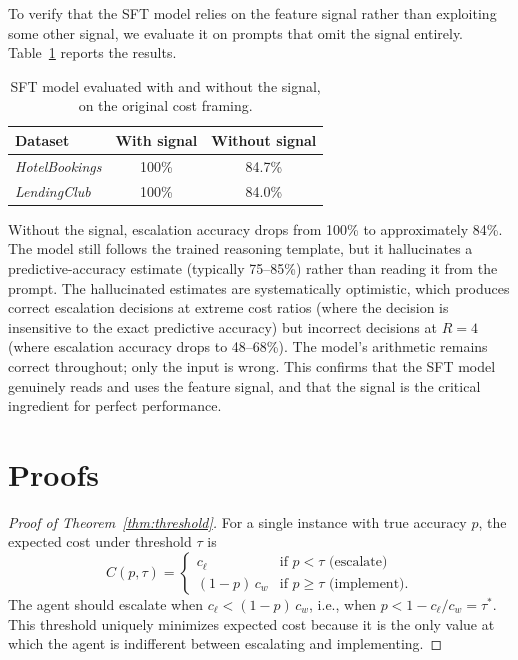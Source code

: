 \documentclass{article}
\begin{document}
To verify that the SFT model relies on the feature signal rather than exploiting some other signal, we evaluate it on prompts that omit the signal entirely. Table~\ref{tab:sft_nosignal} reports the results.

\begin{table}[h]
    \centering
    \caption{SFT model evaluated with and without the signal, on the original cost framing.}
    \label{tab:sft_nosignal}
    \begin{tabular}{lcc}
        \toprule
        Dataset & With signal & Without signal \\
        \midrule
        \emph{HotelBookings} & 100\% & 84.7\% \\
        \emph{LendingClub} & 100\% & 84.0\% \\
        \bottomrule
    \end{tabular}
\end{table}

Without the signal, escalation accuracy drops from 100\% to approximately 84\%. The model still follows the trained reasoning template, but it hallucinates a predictive-accuracy estimate (typically 75--85\%) rather than reading it from the prompt. The hallucinated estimates are systematically optimistic, which produces correct escalation decisions at extreme cost ratios (where the decision is insensitive to the exact predictive accuracy) but incorrect decisions at $R = 4$ (where escalation accuracy drops to 48--68\%). The model's arithmetic remains correct throughout; only the input is wrong. This confirms that the SFT model genuinely reads and uses the feature signal, and that the signal is the critical ingredient for perfect performance.

\section{Proofs}
\label{app:proofs}

\begin{proof}[Proof of Theorem~\ref{thm:threshold}]
For a single instance with true accuracy $p$, the expected cost under threshold $\tau$ is
\[
C(p, \tau) = \begin{cases} c_\ell & \text{if } p < \tau \text{ (escalate)} \\ (1-p) \, c_w & \text{if } p \geq \tau \text{ (implement).} \end{cases}
\]
The agent should escalate when $c_\ell < (1-p) \, c_w$, i.e., when $p < 1 - c_\ell/c_w = \tau^*$. This threshold uniquely minimizes expected cost because it is the only value at which the agent is indifferent between escalating and implementing.
\end{proof}
\end{document}
